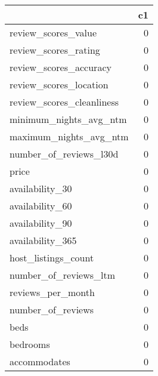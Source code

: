 
\begin{tabular}[t]{lr}
\toprule
  & c1\\
\midrule
review\_scores\_value & 0\\
review\_scores\_rating & 0\\
review\_scores\_accuracy & 0\\
review\_scores\_location & 0\\
review\_scores\_cleanliness & 0\\
\addlinespace
minimum\_nights\_avg\_ntm & 0\\
maximum\_nights\_avg\_ntm & 0\\
number\_of\_reviews\_l30d & 0\\
price & 0\\
availability\_30 & 0\\
\addlinespace
availability\_60 & 0\\
availability\_90 & 0\\
availability\_365 & 0\\
host\_listings\_count & 0\\
number\_of\_reviews\_ltm & 0\\
\addlinespace
reviews\_per\_month & 0\\
number\_of\_reviews & 0\\
beds & 0\\
bedrooms & 0\\
accommodates & 0\\
\bottomrule
\end{tabular}